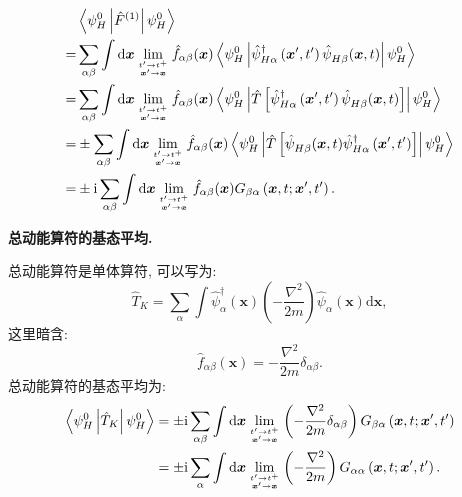 \begin{align}
&\left\langle\psi_{H}^{0}\left|\hat{F}^{(1)}\right| \psi_{H}^{0}\right\rangle \nonumber\\
=&\sum_{\alpha \beta} \int \mathrm{d} \boldsymbol{x} \lim_{t'\to t^+\atop\boldsymbol{x}'\to \boldsymbol{x}}  \hat{f}_{\alpha \beta}(\boldsymbol{x})\left\langle\psi_{H}^{0}\left|\hat{\psi}_{H \alpha}^{\dagger}\left(\boldsymbol{x}^{\prime}, t^{\prime}\right) \hat{\psi}^{}_{H \beta}(\boldsymbol{x}, t)\right| \psi_{H}^{0}\right\rangle \nonumber\\
=&\sum_{\alpha \beta} \int \mathrm{d} \boldsymbol{x} \lim_{t'\to t^+\atop\boldsymbol{x}'\to \boldsymbol{x}}  \hat{f}_{\alpha \beta}(\boldsymbol{x})\left\langle\psi_{H}^{0}\left|\hat{T}\left[\hat{\psi}_{H \alpha}^{\dagger}\left(\boldsymbol{x}^{\prime}, t^{\prime}\right) \hat{\psi}^{}_{H \beta}(\boldsymbol{x}, t)\right]\right| \psi_{H}^{0}\right\rangle \nonumber\\
=&\pm \sum_{\alpha \beta} \int \mathrm{d} \boldsymbol{x} \lim_{t'\to t^+\atop\boldsymbol{x}'\to \boldsymbol{x}} \hat{f}_{\alpha \beta}(\boldsymbol{x})\left\langle\psi_{H}^{0}\left|\hat{T}\left[\hat{\psi}^{}_{H \beta}(\boldsymbol{x}, t) \hat{\psi}_{H \alpha}^{\dagger}\left(\boldsymbol{x}^{\prime}, t^{\prime}\right)\right]\right| \psi_{H}^{0}\right\rangle \nonumber\\
=&\pm \mathrm{i} \sum_{\alpha \beta} \int \mathrm{d} \boldsymbol{x} \lim_{t'\to t^+\atop\boldsymbol{x}'\to \boldsymbol{x}}  \hat{f}_{\alpha \beta}(\boldsymbol{x}) G_{\beta \alpha}\left(\boldsymbol{x}, t ; \boldsymbol{x}^{\prime}, t^{\prime}\right) .
\end{align}

\begin{example}
\textbf{总动能算符的基态平均.}

总动能算符是单体算符, 可以写为:
\begin{equation}
\hat{T}_{K}=\sum_{\alpha} \int \hat{\psi}_{\alpha}^{\dagger}(\boldsymbol{x})\left(-\frac{\nabla^{2}}{2 m}\right) \hat{\psi}^{}_{\alpha}(\boldsymbol{x}) \mathrm{d} \boldsymbol{x},
\end{equation}
这里暗含:
\begin{equation}
\hat{f}_{\alpha \beta}(\boldsymbol{x})=-\frac{\nabla^{2}}{2 m} \delta_{\alpha \beta} .
\end{equation}
总动能算符的基态平均为:
\begin{align}
\left\langle\psi_{H}^{0}\left|\hat{T}_{K}\right| \psi_{H}^{0}\right\rangle&=\pm \mathrm{i} \sum_{\alpha\beta} \int \mathrm{d} \boldsymbol{x} \lim_{t'\to t^+\atop\boldsymbol{x}'\to \boldsymbol{x}}  \left(-\frac{\nabla^{2}}{2 m}\delta_{\alpha \beta}\right) G_{\beta \alpha}\left(\boldsymbol{x}, t ; \boldsymbol{x}^{\prime}, t^{\prime}\right)\nonumber\\
&=\pm \mathrm{i} \sum_{\alpha} \int \mathrm{d} \boldsymbol{x} \lim_{t'\to t^+\atop\boldsymbol{x}'\to \boldsymbol{x}} \left(-\frac{\nabla^{2}}{2 m}\right) G_{\alpha \alpha}\left(\boldsymbol{x}, t ; \boldsymbol{x}^{\prime}, t^{\prime}\right).
\end{align}
\end{example}

